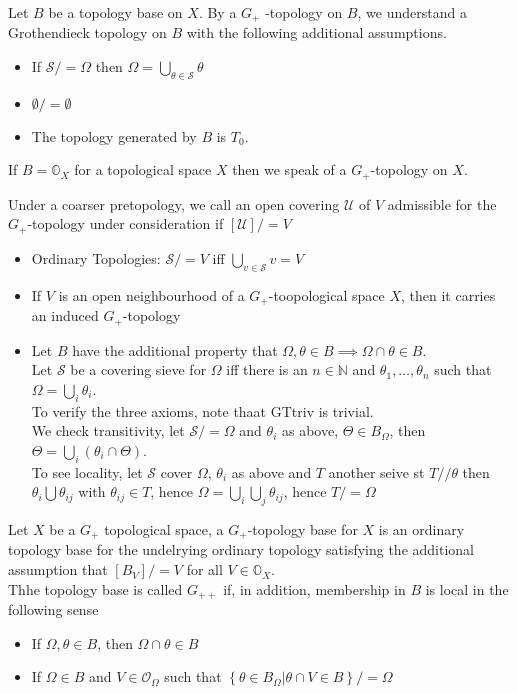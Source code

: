 \documentclass[../main.tex]{subfiles}
\begin{document}
\begin{defn}
	Let $B$ be a topology base on $X$. By a $G_+$ -topology on $B$, we understand a Grothendieck topology on $B$ with the following additional assumptions.
	\begin{itemize}
	\item If $ \mathcal{S} /= \Omega$ then $\Omega= \bigcup_{\theta\in \mathcal{S}} \theta$ 
	\item $\emptyset /=\emptyset$ 
	\item The topology generated by $B$ is $T_0$.
	\end{itemize}
	If $B= \mathbb{O}_X$ for a topological space $X$ then we speak of a $G_+$-topology on $X$.
\end{defn}
\begin{rmq}
Under a coarser pretopology, we call an open covering $\mathcal{U}$ of $V$ admissible for the $G_+$-topology under consideration if $ [ \mathcal{U}] /=V$ 
\end{rmq}
\begin{exemple}
\begin{itemize}
\item Ordinary Topologies: $ \mathcal{S}/= V$ iff $ \bigcup_{v\in \mathcal{S}} v =V$ 
\item If $V$ is an open neighbourhood of a $G_+$-toopological space $X$, then it carries an induced $G_+$-topology
\item Let $B$ have the additional property that $\Omega, \theta\in B \implies \Omega\cap\theta \in B$.\\
	Let $\mathcal{S}$ be a covering sieve for $\Omega$ iff there is an $n \in \mathbb{N}$ and $\theta_1,\ldots,\theta_n$ such that $\Omega= \bigcup_i \theta_i$.\\
	To verify the three axioms, note thaat GTtriv is trivial.\\
	We check transitivity, let $ \mathcal{S}/=\Omega$ and $\theta_i$ as above, $\Theta \in B_{\Omega} $, then $\Theta= \bigcup_i ( \theta_i \cap \Theta) $.\\
	To see locality, let $ \mathcal{S}$ cover $\Omega$, $\theta_i$ as above and $T$ another seive st $T / /\theta$ then $\theta_i \bigcup \theta_{ij} $ with $\theta_{ij} \in T$, hence $\Omega= \bigcup_i\bigcup_j \theta_{ij} $, hence $T/= \Omega$ 
\end{itemize}
\end{exemple}
\begin{defn}
Let $X$ be a $G_+$ topological space, a $G_+$-topology base for $X$ is an ordinary topology base for the undelrying ordinary topology satisfying the additional assumption that $ [ B_V] /= V$ for all $V\in \mathbb{O}_X$.\\
Thhe topology base is called $G_{++}$ if, in addition, membership in $B$ is local in the following sense
\begin{itemize}
\item If $\Omega,\theta\in B$, then $\Omega\cap \theta\in B$ 
\item If $\Omega\in B$ and $V\in \mathcal{O}_{\Omega} $ such that $ \left\{ \theta \in B_{\Omega} |\theta\cap V \in B \right\} /= \Omega$ 
\end{itemize}
\end{defn}
\end{document}

